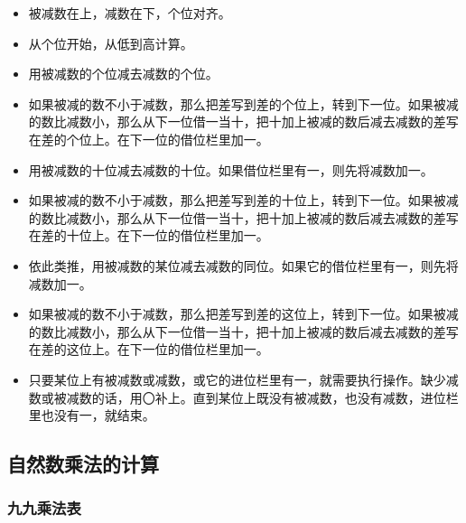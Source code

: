 \documentclass[12pt,UTF8]{ctexbook}
\begin{document}
\begin{itemize}
\item 被减数在上，减数在下，个位对齐。
\item 从个位开始，从低到高计算。
\item 用被减数的个位减去减数的个位。
\item 如果被减的数不小于减数，那么把差写到差的个位上，转到下一位。如果被减的数比减数小，那么从下一位借一当十，把十加上被减的数后减去减数的差写在差的个位上。在下一位的借位栏里加一。
\item 用被减数的十位减去减数的十位。如果借位栏里有一，则先将减数加一。
\item 如果被减的数不小于减数，那么把差写到差的十位上，转到下一位。如果被减的数比减数小，那么从下一位借一当十，把十加上被减的数后减去减数的差写在差的十位上。在下一位的借位栏里加一。
\item 依此类推，用被减数的某位减去减数的同位。如果它的借位栏里有一，则先将减数加一。
\item 如果被减的数不小于减数，那么把差写到差的这位上，转到下一位。如果被减的数比减数小，那么从下一位借一当十，把十加上被减的数后减去减数的差写在差的这位上。在下一位的借位栏里加一。
\item 只要某位上有被减数或减数，或它的进位栏里有一，就需要执行操作。缺少减数或被减数的话，用〇补上。直到某位上既没有被减数，也没有减数，进位栏里也没有一，就结束。
\end{itemize}

\subsection{自然数乘法的计算}

\subsubsection{九九乘法表}
\end{document}
